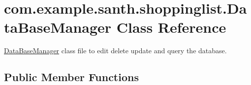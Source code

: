 \hypertarget{classcom_1_1example_1_1santh_1_1shoppinglist_1_1_data_base_manager}{}\section{com.\+example.\+santh.\+shoppinglist.\+Data\+Base\+Manager Class Reference}
\label{classcom_1_1example_1_1santh_1_1shoppinglist_1_1_data_base_manager}


\hyperlink{classcom_1_1example_1_1santh_1_1shoppinglist_1_1_data_base_manager}{Data\+Base\+Manager} class file to edit delete update and query the database.  


\subsection*{Public Member Functions}
